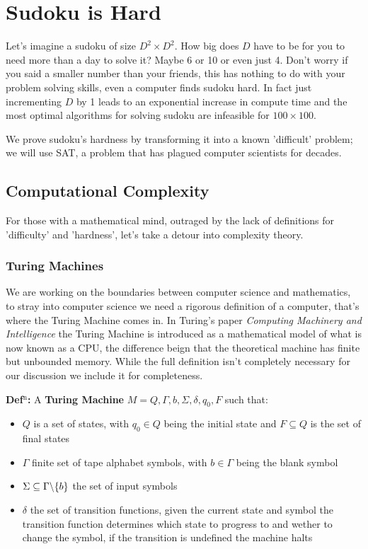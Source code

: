 \documentclass[a4paper,11pt]{report}
\begin{document}


\chapter{Sudoku is Hard}

Let's imagine a sudoku of size $D^2\times D^2$. How big does $D$ have to be for you to need more than a day to solve it? Maybe 6 or 10 or even just 4. Don't worry if you said a smaller number than your friends, this has nothing to do with your problem solving skills, even a computer finds sudoku hard. In fact just incrementing $D$ by 1 leads to an exponential increase in compute time and the most optimal algorithms for solving sudoku are infeasible for $100 \times 100$.

We prove sudoku's hardness by transforming it into a known 'difficult' problem; we will use SAT, a problem that has plagued computer scientists for decades.

\section{Computational Complexity}

For those with a mathematical mind, outraged by the lack of definitions for 'difficulty' and 'hardness', let's take a detour into complexity theory.

\subsection{Turing Machines}

We are working on the boundaries between computer science and mathematics, to stray into computer science we need a rigorous definition of a computer, that's where the Turing Machine comes in. In Turing's paper \textit{Computing Machinery and Intelligence} \cite{turing} the Turing Machine is introduced as a mathematical model of what is now known as a CPU, the difference beign that the theoretical machine has finite but unbounded memory. While the full definition isn't completely necessary for our discussion we include it for completeness.

\textbf{Def$^\text{n}$:} A \textbf{Turing Machine} $M={Q,\Gamma,b,\Sigma, \delta, q_0, F}$ such that:
\begin{itemize}
\item $Q$ is a set of states, with $q_0\in Q$ being the initial state and $F\subseteq Q$ is the set of final states
\item $\Gamma$ finite set of tape alphabet symbols, with $b\in \Gamma$ being the blank symbol
\item $\Sigma\subseteq \Gamma \symbol{92} \{b\}$ the set of input symbols
\item $\delta$ the set of transition functions, given the current state and symbol the transition function determines which state to progress to and wether to change the symbol, if the transition is undefined the machine halts
\end{itemize}
\end{document}
